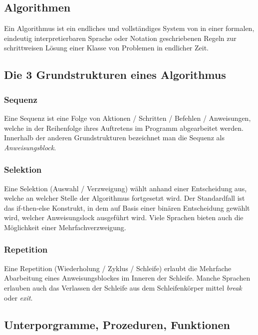 \documentclass{article}
\begin{document}
\subsection{Algorithmen}

Ein Algorithmus ist ein endliches und vollständiges System von in einer formalen, eindeutig interpretierbaren
Sprache oder Notation geschriebenen Regeln zur schrittweisen Lösung einer Klasse von Problemen in endlicher
Zeit.

\subsection*{Die 3 Grundstrukturen eines Algorithmus}

\subsubsection*{Sequenz}

Eine Sequenz ist eine Folge von Aktionen / Schritten / Befehlen / Anweisungen, welche in der Reihenfolge ihres Auftretens im Programm
abgearbeitet werden.
Innerhalb der anderen Grundstrukturen bezeichnet man die Sequenz als \emph{Anweisungsblock}.

\subsubsection*{Selektion}

Eine Selektion (Auswahl / Verzweigung) wählt anhand einer Entscheidung aus, welche an welcher Stelle der Algorithmus fortgesetzt wird.
Der Standardfall ist das if-then-else Konstrukt, in dem auf Basis einer binären Entscheidung gewählt wird, welcher
Anweisungslock ausgeführt wird.
Viele Sprachen bieten auch die Möglichkeit einer Mehrfachverzweigung.

\subsubsection*{Repetition}

Eine Repetition (Wiederholung / Zyklus / Schleife) erlaubt die Mehrfache Abarbeitung eines Anweisungsblockes im Inneren der Schleife.
Manche Sprachen erlauben auch das Verlassen der Schleife aus dem Schleifenkörper mittel \emph{break} oder \emph{exit}.

\subsection*{Unterporgramme, Prozeduren, Funktionen}
\end{document}

